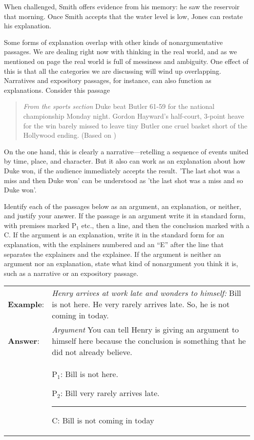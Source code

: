 {When challenged, Smith offers evidence from his memory: he saw the reservoir that morning. Once Smith accepts that the water level is low, Jones can restate his explanation.

Some forms of explanation overlap with other kinds of nonargumentative passages. We are dealing right now with thinking in the real world, and as we mentioned on page \pageref{messiness_warning} the real world is full of messiness and ambiguity. One effect of this is that all the categories we are discussing will wind up overlapping. Narratives and expository passages, for instance, can also function as explanations. Consider this passage

\begin{quotation} \noindent\textit{From the sports section} Duke beat Butler 61-59 for the national championship Monday night. Gordon Hayward's half-court, 3-point heave for the win barely missed to leave tiny Butler one cruel basket short of the Hollywood ending. (Based on \cite{AP2010}) \end{quotation}

On the one hand, this is clearly a narrative---retelling a sequence of events united by time, place, and character. But it also can work as an explanation about how Duke won, if the audience immediately accepts the result. 'The last shot was a miss\textit{ }and then Duke won' can be understood as 'the last shot was a miss and so Duke won'.




\practiceproblems 
\problempart Identify each of the passages below as an argument, an explanation, or neither, and justify your answer. If the passage is an argument write it in standard form, with premises marked P$_1$ etc., then a line, and then the conclusion marked with a C. If the argument is an explanation, write it in the standard form for an explanation, with the explainers numbered and an ``E'' after the line that separates the explainers and the explainee. If the argument is neither an argument nor an explanation, state what kind of nonargument you think it is, such as a narrative or an expository passage.
 
\begin{longtabu}{p{.1\linewidth}p{.9\linewidth}}
\textbf{Example}: & \textit{Henry arrives at work late and wonders to himself: }Bill is not here. He very rarely arrives late. So, he is not coming in today. \\
\textbf{Answer}: & \textit{Argument} You can tell Henry is giving an argument to himself here because the conclusion is something that he did not already believe. \\
&\begin{earg}
\item[P$_1$:] Bill is not here. 
\item[P$_2$:] Bill very rarely arrives late. 
\vspace{-.5em}
\item [] \rule{0.6\linewidth}{.5pt} 
\item[C:] Bill is not coming in today
\end{earg} 
\end{longtabu}


}
